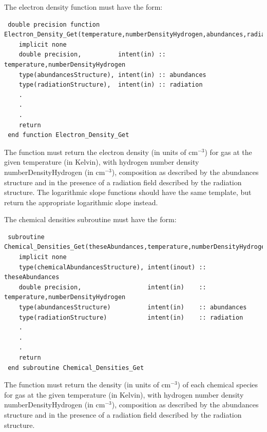 The electron density function must have the form:
\begin{verbatim}
 double precision function Electron_Density_Get(temperature,numberDensityHydrogen,abundances,radiation)
    implicit none
    double precision,          intent(in) :: temperature,numberDensityHydrogen
    type(abundancesStructure), intent(in) :: abundances
    type(radiationStructure),  intent(in) :: radiation
    .
    .
    .
    return
 end function Electron_Density_Get
\end{verbatim}
The function must return the electron density (in units of cm$^{-3}$) for gas at the given {\normalfont \ttfamily temperature} (in Kelvin), with hydrogen number density {\normalfont \ttfamily numberDensityHydrogen} (in cm$^{-3}$), composition as described by the {\normalfont \ttfamily abundances} structure and in the presence of a radiation field described by the {\normalfont \ttfamily radiation} structure. The logarithmic slope functions should have the same template, but return the appropriate logarithmic slope instead.

The chemical densities subroutine must have the form:
\begin{verbatim}
 subroutine Chemical_Densities_Get(theseAbundances,temperature,numberDensityHydrogen,abundances,radiation)
    implicit none
    type(chemicalAbundancesStructure), intent(inout) :: theseAbundances
    double precision,                  intent(in)    :: temperature,numberDensityHydrogen
    type(abundancesStructure)          intent(in)    :: abundances
    type(radiationStructure)           intent(in)    :: radiation
    .
    .
    .
    return
 end subroutine Chemical_Densities_Get
\end{verbatim}
The function must return the density (in units of cm$^{-3}$) of each chemical species for gas at the given {\normalfont \ttfamily temperature} (in Kelvin), with hydrogen number density {\normalfont \ttfamily numberDensityHydrogen} (in cm$^{-3}$), composition as described by the {\normalfont \ttfamily abundances} structure and in the presence of a radiation field described by the {\normalfont \ttfamily radiation} structure.


